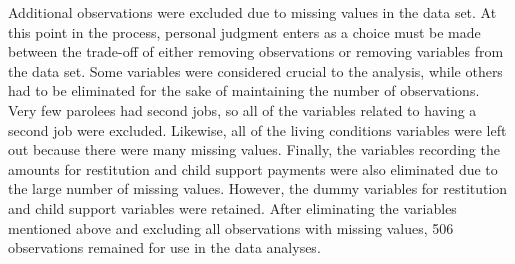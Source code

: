 Additional observations were excluded due to missing values in the data set.  At this point in the process, personal judgment enters as a choice must be made between the trade-off of either removing observations or removing variables from the data set.  Some variables were considered crucial to the analysis, while others had to be eliminated for the sake of maintaining the number of observations.  Very few parolees had second jobs, so all of the variables related to having a second job were excluded.  Likewise, all of the living conditions variables were left out because there were many missing values.  Finally, the variables recording the amounts for restitution and child support payments were also eliminated due to the large number of missing values.  However, the dummy variables for restitution and child support variables were retained.  After eliminating the variables mentioned above and excluding all observations with missing values, 506 observations remained for use in the data analyses.



